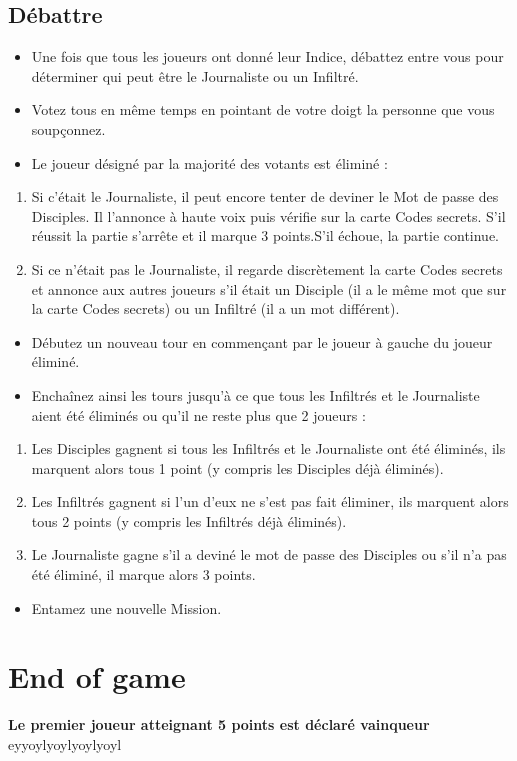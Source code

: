 \documentclass{article}%
\begin{document}
\subsection{ Débattre
}%
\label{subsec:Dbattre}%
\begin{itemize}%
\item%
%
  Une fois que tous les joueurs ont donné leur Indice, débattez entre vous pour déterminer qui peut être le Journaliste ou un Infiltré.
%
\item%
%
  Votez tous en même temps en pointant de votre doigt la personne que vous soupçonnez.
%
\item%
%
  Le joueur désigné par la majorité des votants est éliminé :
%
\end{itemize}%
\begin{enumerate}%
\item%
%
  Si c’était le Journaliste, il peut encore tenter de deviner le Mot de passe des Disciples. Il l'annonce à haute voix puis vérifie sur la carte Codes secrets. S’il réussit la partie s’arrête et il marque 3 points.S’il échoue, la partie continue.
%
\item%
%
  Si ce n’était pas le Journaliste, il regarde discrètement la carte Codes secrets et annonce aux autres joueurs s’il était un Disciple (il a le même mot que sur la carte Codes secrets) ou un Infiltré (il a un mot différent).
%
\end{enumerate}%
\begin{itemize}%
\item%
%
  Débutez un nouveau tour en commençant par le joueur à gauche du joueur éliminé.
%
\item%
%
  Enchaînez ainsi les tours jusqu’à ce que tous les Infiltrés et le Journaliste aient été éliminés ou qu’il ne reste plus que 2 joueurs :
%
\end{itemize}%
\begin{enumerate}%
\item%
%
  Les Disciples gagnent si tous les Infiltrés et le Journaliste ont été éliminés, ils marquent alors tous 1 point (y compris les Disciples déjà éliminés).
%
\item%
%
  Les Infiltrés gagnent si l'un d'eux ne s'est pas fait éliminer, ils marquent alors tous 2 points (y compris les Infiltrés déjà éliminés).
%
\item%
%
  Le Journaliste gagne s'il a deviné le mot de passe des Disciples ou s'il n'a pas été éliminé, il marque alors 3 points.
%
\end{enumerate}%
\begin{itemize}%
\item%
%
  Entamez une nouvelle Mission.
%
\end{itemize}

%
\section{ End of game
}%
\label{sec:Endofgame}%
\textbf{Le premier joueur atteignant 5 points est déclaré vainqueur}%
\textbf{}%
 eyyoylyoylyoylyoyl

%
\end{document}
